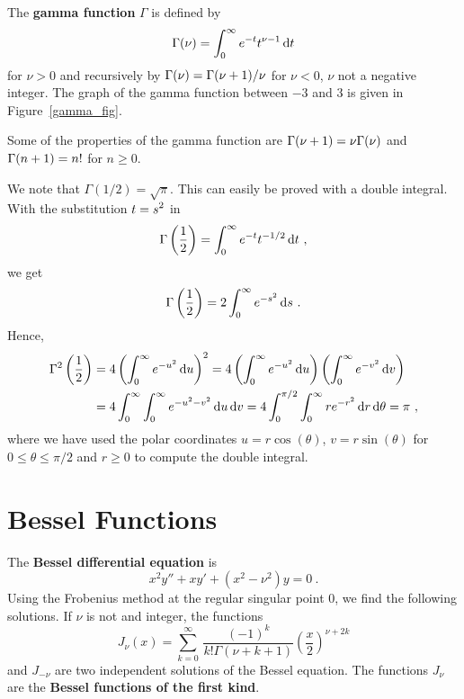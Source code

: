 The {\bfseries gamma function} $\Gamma$ is defined by
\[
\Gamma(\nu) = \int_0^\infty e^{-t} t^{\nu-1} \,\mathrm{d}{t}
\]
for $\nu > 0$ and recursively by
$\displaystyle \Gamma(\nu) = \Gamma(\nu + 1)/\nu$
for $\nu < 0$, $\nu$ not a negative integer.  The graph of the gamma
function between $-3$ and $3$ is given in Figure~\ref{gamma_fig}.

Some of the properties of the gamma function are
$\displaystyle \Gamma(\nu+1) = \nu \Gamma(\nu)$ and
$\displaystyle \Gamma(n+1) = n!$ for $n \geq 0$.


We note that $\Gamma(1/2) = \sqrt{\pi}$.  This can easily be proved
with a double integral.  With the substitution $\displaystyle t = s^2$ in
\[
\Gamma\left(\frac{1}{2}\right) = \int_0^\infty e^{-t} t^{-1/2} \,\mathrm{d}{t} \ ,
\]
we get
\[
\Gamma\left(\frac{1}{2}\right) = 2 \int_0^\infty e^{-s^2} \,\mathrm{d}{s} \ .
\]
Hence,
\begin{align*}
\Gamma^2\left(\frac{1}{2}\right)
&= 4 \left(\int_0^\infty e^{-u^2} \,\mathrm{d}{u}\right)^2
= 4 \left(\int_0^\infty e^{-u^2} \,\mathrm{d}{u}\right)
\left( \int_0^\infty e^{-v^2} \,\mathrm{d}{v}\right) \\
&= 4 \int_0^\infty \int_0^\infty e^{-u^2-v^2} \,\mathrm{d}{u} \,\mathrm{d}{v}
= 4 \int_0^{\pi/2} \int_0^\infty r e^{-r^2} \,\mathrm{d}{r}\,\mathrm{d}{\theta} = \pi \ ,
\end{align*}
where we have used the polar coordinates $u=r\cos(\theta)$,
$v=r\sin(\theta)$ for $0\leq \theta \leq \pi/2$ and $r\geq 0$ to
compute the double integral.

\section{Bessel Functions}

The {\bfseries Bessel differential equation} is 
\begin{equation} \label{spv_bess_equ}
x^2 y'' + x y' + (x^2 - \nu^2) y = 0 \ .
\end{equation}
Using the Frobenius method at the regular singular point $0$, we find
the following solutions.  If $\nu$ is not and integer, the functions
\[
J_\nu(x) = \sum_{k=0}^{\infty} \, \frac{(-1)^k}{k! \Gamma(\nu+k+1)}
\left(\frac{x}{2}\right)^{\nu+2k}
\]
and $J_{-\nu}$ are two independent solutions of the Bessel equation.
The functions $J_\nu$ are the {\bfseries Bessel functions of the first
kind}.

